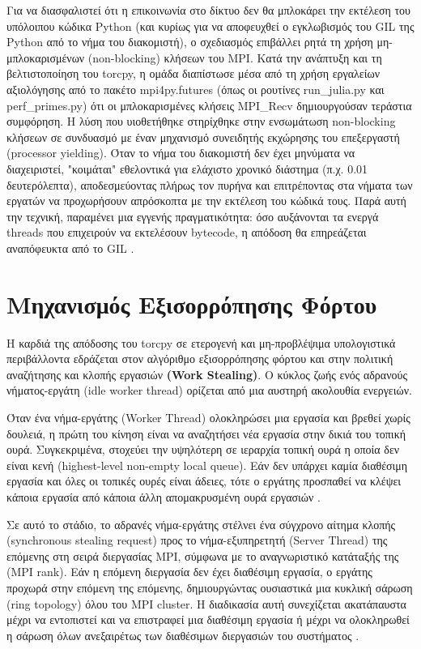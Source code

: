 Για να διασφαλιστεί ότι η επικοινωνία στο δίκτυο δεν θα μπλοκάρει την εκτέλεση του υπόλοιπου κώδικα Python (και κυρίως για να αποφευχθεί ο εγκλωβισμός του GIL της Python από το νήμα του διακομιστή), ο σχεδιασμός επιβάλλει ρητά τη χρήση μη-μπλοκαρισμένων (non-blocking) κλήσεων του MPI. Κατά την ανάπτυξη και τη βελτιστοποίηση του torcpy, η ομάδα διαπίστωσε μέσα από τη χρήση εργαλείων αξιολόγησης από το πακέτο mpi4py.futures (όπως οι ρουτίνες run\_julia.py και perf\_primes.py) ότι οι μπλοκαρισμένες κλήσεις MPI\_Recv δημιουργούσαν τεράστια συμφόρηση. Η λύση που υιοθετήθηκε στηρίχθηκε στην ενσωμάτωση non-blocking κλήσεων σε συνδυασμό με έναν μηχανισμό συνειδητής εκχώρησης του επεξεργαστή (processor yielding). Όταν το νήμα του διακομιστή δεν έχει μηνύματα να διαχειριστεί, "κοιμάται" εθελοντικά για ελάχιστο χρονικό διάστημα (π.χ. 0.01 δευτερόλεπτα), αποδεσμεύοντας πλήρως τον πυρήνα και επιτρέποντας στα νήματα των εργατών να προχωρήσουν απρόσκοπτα με την εκτέλεση του κώδικά τους. Παρά αυτή την τεχνική, παραμένει μια εγγενής πραγματικότητα: όσο αυξάνονται τα ενεργά threads που επιχειρούν να εκτελέσουν bytecode, η απόδοση θα επηρεάζεται αναπόφευκτα από το GIL \cite{hadjidoukas2020torcpy}.

\section{Μηχανισμός Εξισορρόπησης Φόρτου}

Η καρδιά της απόδοσης του torcpy σε ετερογενή και μη-προβλέψιμα υπολογιστικά περιβάλλοντα εδράζεται στον αλγόριθμο εξισορρόπησης φόρτου και στην πολιτική αναζήτησης και κλοπής εργασιών \textbf{(Work Stealing)}. Ο κύκλος ζωής ενός αδρανούς νήματος-εργάτη (idle worker thread) ορίζεται από μια αυστηρή ακολουθία ενεργειών. 

Όταν ένα νήμα-εργάτης (Worker Thread) ολοκληρώσει μια εργασία και βρεθεί χωρίς δουλειά, η πρώτη του κίνηση είναι να αναζητήσει νέα εργασία στην δικιά του τοπική ουρά. Συγκεκριμένα, στοχεύει την υψηλότερη σε ιεραρχία τοπική ουρά η οποία δεν είναι κενή (highest-level non-empty local queue). Εάν δεν υπάρχει καμία διαθέσιμη εργασία και όλες οι τοπικές ουρές είναι άδειες, τότε ο εργάτης προσπαθεί να κλέψει κάποια εργασία από κάποια άλλη απομακρυσμένη ουρά εργασιών \cite{hadjidoukas2020torcpy}.

Σε αυτό το στάδιο, το αδρανές νήμα-εργάτης στέλνει ένα σύγχρονο αίτημα κλοπής (synchronous stealing request) προς το νήμα-εξυπηρετητή (Server Thread) της επόμενης στη σειρά διεργασίας MPI, σύμφωνα με το αναγνωριστικό κατάταξής της (MPI rank). Εάν η επόμενη διεργασία δεν έχει διαθέσιμη εργασία, ο εργάτης προχωρά στην επόμενη της επόμενης, δημιουργώντας ουσιαστικά μια κυκλική σάρωση (ring topology) όλου του MPI cluster. Η διαδικασία αυτή συνεχίζεται ακατάπαυστα μέχρι να εντοπιστεί και να επιστραφεί μια διαθέσιμη εργασία ή μέχρι να ολοκληρωθεί η σάρωση όλων ανεξαιρέτως των διαθέσιμων διεργασιών του συστήματος \cite{hadjidoukas2020torcpy}.


